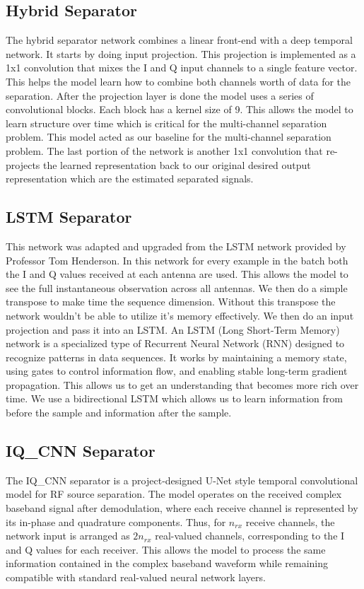 \documentclass[conference]{IEEEtran}
\begin{document}
\subsection{Hybrid Separator}
    The hybrid separator network combines a linear front-end with a deep temporal network. It starts by doing input projection. This projection is implemented as a 1x1 convolution that mixes the I and Q input channels to a single feature vector. This helps the model learn how to combine both channels worth of data for the separation. After the projection layer is done the model uses a series of convolutional blocks. Each block has a kernel size of 9. This allows the model to learn structure over time which is critical for the multi-channel separation problem. This model acted as our baseline for the multi-channel separation problem. The last portion of the network is another 1x1 convolution that re-projects the learned representation back to our original desired output representation which are the estimated separated signals.
\subsection{LSTM Separator}
    This network was adapted and upgraded from the LSTM network provided by Professor Tom Henderson. In this network for every example in the batch both the I and Q values received at each antenna are used. This allows the model to see the full instantaneous observation across all antennas. We then do a simple transpose to make time the sequence dimension. Without this transpose the network wouldn't be able to utilize it's memory effectively. We then do an input projection and pass it into an LSTM. An LSTM (Long Short-Term Memory) network is a specialized type of Recurrent Neural Network (RNN) designed to recognize patterns in data sequences. It works by maintaining a memory state, using gates to control information flow, and enabling stable long-term gradient propagation. This allows us to get an understanding that becomes more rich over time. We use a bidirectional LSTM which allows us to learn information from before the sample and information after the sample.

\subsection{IQ\_CNN Separator}
    The IQ\_CNN separator is a project-designed U-Net style temporal convolutional model for RF source separation. The model operates on the received complex baseband signal after demodulation, where each receive channel is represented by its in-phase and quadrature components. Thus, for $n_{rx}$ receive channels, the network input is arranged as $2n_{rx}$ real-valued channels, corresponding to the I and Q values for each receiver. This allows the model to process the same information contained in the complex baseband waveform while remaining compatible with standard real-valued neural network layers.
    
\end{document}
